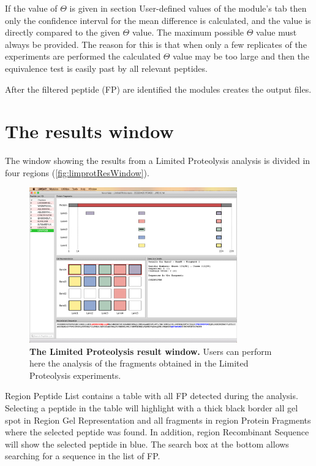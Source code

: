 If the value of $\Theta$ is given in section User-defined values of the module's tab
then only the confidence interval for the mean difference is calculated, and the value
is directly compared to the given $\Theta$ value. The maximum possible $\Theta$ value
must always be provided. The reason for this is that when only a few replicates of the
experiments are performed the calculated $\Theta$ value may be too large and then
the equivalence test is easily past by all relevant peptides.

After the filtered peptide (FP) are identified the modules creates the output files.

\section{The results window}

The window showing the results from a Limited Proteolysis analysis is divided in
four regions (\autoref{fig:limprotResWindow}).

\begin{figure}[h]
    \centering
    \includegraphics[width=0.8\textwidth]{./IMAGES/MOD-LIMPROT/limprot-res.jpg}
    \caption[The Limited Proteolysis result window]{\textbf{The Limited Proteolysis
    result window.} Users can perform here the analysis of the fragments obtained
    in the Limited Proteolysis experiments.}
    \label{fig:limprotResWindow}
    \vspace{-5pt}
\end{figure}

Region Peptide List contains a table with all FP detected during the analysis. Selecting
a peptide in the table will highlight with a thick black border all gel spot in
Region Gel Representation and all fragments in region Protein Fragments where the
selected peptide was found. In addition, region Recombinant Sequence will show the
selected peptide in blue. The search box at the bottom allows searching for a sequence
in the list of FP.

